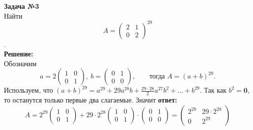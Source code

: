\textbf{\large Задача №3}\\
\hspace*{0.5cm} Найти 
\[A = \begin{pmatrix}
	2 & 1 \\ 0 & 2
\end{pmatrix}^{29}\].\\[0.5cm]
\textbf{Решение:}\\
\hspace*{0.5cm}
Обозначим
\begin{equation*}
	a = 2 \begin{pmatrix}
		1&0\\0&1
	\end{pmatrix},\ 
	b =  \begin{pmatrix}
		0&1\\0&0
	\end{pmatrix}, \qquad\text{тогда }
	A = \left(a + b\right)^{29}.
\end{equation*}
Используем, что $(a + b)^{29} = a^{29} + 29 a^{28}b + \frac{29 \cdot 28}{2} a^{27}b^2 + \ldots + b^{29}$.
Так как $b^2 = \mathbf0$, то останутся только первые два слагаемые.
Значит \textbf{ответ:}
\[A = 2^{29} \begin{pmatrix}
	1&0\\0&1\end{pmatrix} + 29 \cdot 2^{28} \begin{pmatrix}
		1&0\\0&1 
	\end{pmatrix} \cdot \begin{pmatrix}
	0&1\\0&0
	\end{pmatrix} = \begin{pmatrix}
	2^{29} & 29 \cdot 2^{28} \\ 0 & 2^{29}
	\end{pmatrix}
\]
\vspace{0.5cm}
